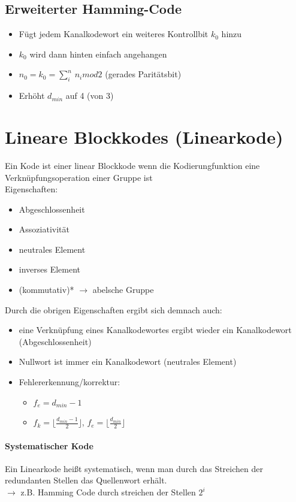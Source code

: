 \documentclass[12pt,a4paper]{article}
\begin{document}
\subsection{Erweiterter Hamming-Code}
\begin{itemize}
\item Fügt jedem Kanalkodewort ein weiteres Kontrollbit $k_0$ hinzu
\item $k_0$ wird dann hinten einfach angehangen
\item $n_0 = k_0 = \sum_i^n \, n_i mod 2$ (gerades Paritätsbit)
\item Erhöht $d_{min}$ auf 4 (von 3)
\end{itemize}


\section{Lineare Blockkodes (Linearkode)}
Ein Kode ist einer linear Blockkode wenn die Kodierungfunktion eine Verknüpfungsoperation einer Gruppe ist\\
Eigenschaften:
\begin{itemize}
\item Abgeschlossenheit
\item Assoziativität
\item neutrales Element
\item inverses Element
\item (kommutativ)* $\rightarrow$ abelsche Gruppe
\end{itemize}
Durch die obrigen Eigenschaften ergibt sich demnach auch:
\begin{itemize}
\item eine Verknüpfung eines Kanalkodewortes ergibt wieder ein Kanalkodewort (Abgeschlossenheit)
\item Nullwort ist immer ein Kanalkodewort (neutrales Element)
\item Fehlererkennung/korrektur:
\begin{itemize}
\item $f_e = d_{min} - 1$
\item $f_k = \lfloor \frac{d_{min} - 1}{2} \rfloor$, $f_e = \lfloor \frac{d_{min}}{2} \rfloor$ 
\end{itemize}
\end{itemize}

\paragraph{Systematischer Kode\\}
Ein Linearkode heißt systematisch, wenn man durch das Streichen der redundanten Stellen das Quellenwort erhält.\\
$\rightarrow$ z.B. Hamming Code durch streichen der Stellen $2^i$
\end{document}
